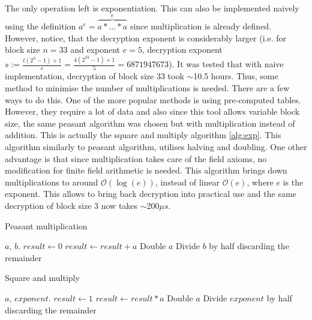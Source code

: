 \documentclass{Resources/UoBLab1}
\theoremstyle{definition}
\begin{document}
The only operation left is exponentiation. This can also be implemented naively using the definition $a^e = \overbrace{a * ... * a}^e$ since multiplication is already defined. However, notice, that the decryption exponent is considerably larger (i.e. for block size $n = 33$ and exponent $e = 5$, decryption exponent $s := \frac{t(2^n-1)+1}{e} = \frac{4(2^{33}-1)+1}{5} = 6871947673$). It was tested that with naive implementation, decryption of block size 33 took $\sim$10.5 hours. Thus, some method to minimise the number of multiplications is needed. There are a few ways to do this. One of the more popular methods is using pre-computed tables. However, they require a lot of data and also since this tool allows variable block size, the same peasant algorithm was chosen but with multiplication instead of addition. This is actually the square and multiply algorithm \ref{alg:exp}. This algorithm similarly to peasant algorithm, utilises halving and doubling. One other advantage is that since multiplication takes care of the field axioms, no modification for finite field arithmetic is needed. This algorithm brings down multiplications to around $\mathcal{O}(\log(e))$, instead of linear $\mathcal{O}(e)$, where $e$ is the exponent. This allows to bring back decryption into practical use and the same decryption of block size 3 now takes $\sim$200$\mu s$.


\begin{minipage}{0.46\textwidth}
\begin{algorithm}[H]
    \caption{Peasant multiplication}\label{alg:mult}
    \begin{algorithmic}
        \Require $a$, $b$.
        \State $result \gets 0$
                \State $result \gets result + a$
            \EndIf
            \State Double $a$
            \State Divide $b$ by half discarding the remainder
        \EndWhile
    \end{algorithmic}
\end{algorithm}
\end{minipage}
\hfill
\begin{minipage}{0.46\textwidth}
\begin{algorithm}[H]
    \caption{Square and multiply}\label{alg:exp}
    \begin{algorithmic}
        \Require $a$, $exponent$.
        \State $result \gets 1$
                \State $result \gets result * a$
            \EndIf
            \State Double $a$
            \State Divide $exponent$ by half discarding the remainder
        \EndWhile
    \end{algorithmic}
\end{algorithm}
\end{minipage}
\end{document}
